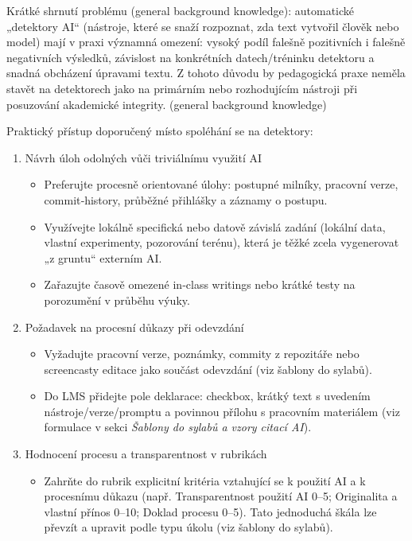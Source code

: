 \noindent
Krátké shrnutí problému (general background knowledge): automatické „detektory AI“ (nástroje, které se snaží rozpoznat, zda text vytvořil člověk nebo model) mají v praxi významná omezení: vysoký podíl falešně pozitivních i falešně negativních výsledků, závislost na konkrétních datech/tréninku detektoru a snadná obcházení úpravami textu. Z tohoto důvodu by pedagogická praxe neměla stavět na detektorech jako na primárním nebo rozhodujícím nástroji při posuzování akademické integrity. (general background knowledge)

\bigskip

\noindent
Praktický přístup doporučený místo spoléhání se na detektory:
\begin{enumerate}
  \item Návrh úloh odolných vůči triviálnímu využití AI
    \begin{itemize}
      \item Preferujte procesně orientované úlohy: postupné milníky, pracovní verze, commit‑history, průběžné přihlášky a záznamy o postupu.
      \item Využívejte lokálně specifická nebo datově závislá zadání (lokální data, vlastní experimenty, pozorování terénu), která je těžké zcela vygenerovat „z gruntu“ externím AI.
      \item Zařazujte časově omezené in‑class writings nebo krátké testy na porozumění v průběhu výuky.
    \end{itemize}

  \item Požadavek na procesní důkazy při odevzdání
    \begin{itemize}
      \item Vyžadujte pracovní verze, poznámky, commity z repozitáře nebo screencasty editace jako součást odevzdání (viz šablony do sylabů).
      \item Do LMS přidejte pole deklarace: checkbox, krátký text s uvedením nástroje/verze/promptu a povinnou přílohu s pracovním materiálem (viz formulace v sekci \emph{Šablony do sylabů a vzory citací AI}).
    \end{itemize}

  \item Hodnocení procesu a transparentnost v rubrikách
    \begin{itemize}
      \item Zahrňte do rubrik explicitní kritéria vztahující se k použití AI a k procesnímu důkazu (např. Transparentnost použití AI 0–5; Originalita a vlastní přínos 0–10; Doklad procesu 0–5). Tato jednoduchá škála lze převzít a upravit podle typu úkolu (viz šablony do sylabů).
    \end{itemize}


\end{enumerate}
